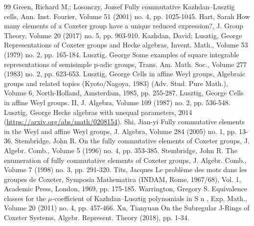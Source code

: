 \begin{thebibliography}{99}
 Green, Richard M.; Losonczy, Jozsef Fully commutative Kazhdan–Lusztig cells, Ann. Inst. Fourier, Volume 51 (2001) no. 4, pp. 1025-1045.
 Hart, Sarah How many elements of a Coxeter group have a unique reduced expression?, J. Group Theory, Volume 20 (2017) no. 5, pp. 903-910.
 Kazhdan, David; Lusztig, George Representations of Coxeter groups and Hecke algebras, Invent. Math., Volume 53 (1979) no. 2, pp. 165-184.
 Lusztig, George Some examples of square integrable representations of semisimple p-adic groups, Trans. Am. Math. Soc., Volume 277 (1983) no. 2, pp. 623-653.
 Lusztig, George Cells in affine Weyl groups, Algebraic groups and related topics (Kyoto/Nagoya, 1983) (Adv. Stud. Pure Math.), Volume 6, North-Holland, Amsterdam, 1985, pp. 255-287.
 Lusztig, George Cells in affine Weyl groups. II, J. Algebra, Volume 109 (1987) no. 2, pp. 536-548.
 Lusztig, George Hecke algebras with unequal parameters, 2014 (\url{https://arxiv.org/abs/math/0208154}).
 Shi, Jian-yi Fully commutative elements in the Weyl and affine Weyl groups, J. Algebra, Volume 284 (2005) no. 1, pp. 13-36.
 Stembridge, John R. On the fully commutative elements of Coxeter groups, J. Algebr. Comb., Volume 5 (1996) no. 4, pp. 353-385.
 Stembridge, John R. The enumeration of fully commutative elements of Coxeter groups, J. Algebr. Comb., Volume 7 (1998) no. 3, pp. 291-320.
 Tits, Jacques Le problème des mots dans les groupes de Coxeter, Symposia Mathematica (INDAM, Rome, 1967/68), Vol. 1, Academic Press, London, 1969, pp. 175-185.
 Warrington, Gregory S. Equivalence classes for the \(\mu\)-coefficient of Kazhdan–Lusztig polynomials in S n , Exp. Math., Volume 20 (2011) no. 4, pp. 457-466.
 Xu, Tianyuan On the Subregular J-Rings of Coxeter Systems, Algebr. Represent. Theory (2018), pp. 1-34.
\end{thebibliography}
